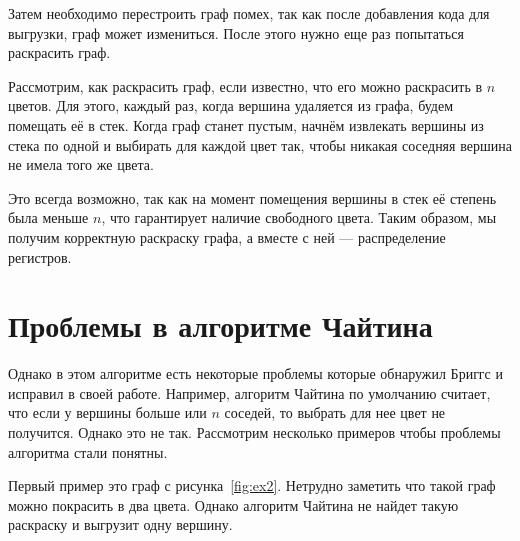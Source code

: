 \documentclass[12pt]{article}
\begin{document}
Затем необходимо перестроить граф помех, так как после добавления кода для выгрузки, граф может измениться. После этого нужно
еще раз попытаться раскрасить граф.

Рассмотрим, как раскрасить граф, если известно, что его можно раскрасить в $n$ цветов. Для этого, каждый раз, когда вершина
удаляется из графа, будем помещать её в стек. Когда граф станет пустым, начнём извлекать вершины из стека по одной и выбирать
для каждой цвет так, чтобы никакая соседняя вершина не имела того же цвета. 

Это всегда возможно, так как на момент помещения вершины в стек её степень была меньше $n$, что гарантирует наличие свободного
цвета. Таким образом, мы получим корректную раскраску графа, а вместе с ней — распределение регистров.

\section{Проблемы в алгоритме Чайтина}

Однако в этом алгоритме есть некоторые проблемы которые обнаружил Бриггс и исправил в своей работе.
Например, алгоритм Чайтина по умолчанию считает, что если у вершины больше или $n$ соседей, то выбрать для нее цвет не получится.
Однако это не так. 
Рассмотрим несколько примеров чтобы проблемы алгоритма стали понятны.

Первый пример это граф с рисунка~\ref{fig:ex2}. Нетрудно заметить что такой граф можно покрасить в два цвета.
Однако алгоритм Чайтина не найдет такую раскраску и выгрузит одну вершину.

\begin{figure}[H]
    \centering
\end{figure} %
\end{document}
